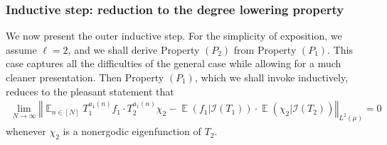\documentclass[11pt]{amsart}
\theoremstyle{definition}
\DeclareMathOperator*{\E}{\mathbb{E}}
\newcommand{\CI}{{\mathcal I}}
\newcommand{\norm}[1]{\left\Vert #1\right\Vert}
\newcommand{\1}{{\mathbf{1}}}
\begin{document}
\subsubsection{Inductive step: reduction to the degree lowering property}\label{SS: reduction to degree lowering}
We now present the outer inductive step. For the simplicity of exposition, we assume $\ell=2$, and we shall derive Property $(P_2)$ from Property $(P_1)$. This case captures all the difficulties of the general case while allowing for a much cleaner presentation.
Then Property $(P_1)$, which we shall invoke inductively, reduces to the pleasant statement that 
\begin{align*}
    \lim_{N\to\infty} \norm{\E_{n\in[N]} T_1^{a_1(n)}f_1 \cdot T_2^{a_1(n)}\chi_2 - \E(f_1|\CI(T_1))\cdot \E(\chi_2|\CI(T_2))}_{L^2(\mu)} = 0
\end{align*}
whenever $\chi_2$ is a nonergodic eigenfunction of $T_2$.
\end{document}
